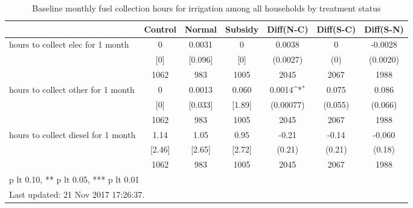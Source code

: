 \begin{table}[htbp]\centering
\def\sym#1{\ifmmode^{#1}\else\(^{#1}\)\fi}
\caption{Baseline monthly fuel collection hours for irrigation among all households by treatment status \label{tab:"balance"}}
\begin{tabular*}{1\hsize}{@{\hskip\tabcolsep\extracolsep\fill}l*{1}{cccccc}}
\toprule
                                &  Control&   Normal&  Subsidy&Diff(N-C)         &Diff(S-C)         &Diff(S-N)         \\
\midrule
hours to collect elec for 1 month&        0&   0.0031&        0&   0.0038         &        0         &  -0.0028         \\
                                &      [0]&  [0.096]&      [0]& (0.0027)         &      (0)         & (0.0020)         \\
                                &     1062&      983&     1005&     2045         &     2067         &     1988         \\
hours to collect other for 1 month&        0&   0.0013&    0.060&   0.0014\sym{*}  &    0.075         &    0.086         \\
                                &      [0]&  [0.033]&   [1.89]&(0.00077)         &  (0.055)         &  (0.066)         \\
                                &     1062&      983&     1005&     2045         &     2067         &     1988         \\
hours to collect diesel for 1 month&     1.14&     1.05&     0.95&    -0.21         &    -0.14         &   -0.060         \\
                                &   [2.46]&   [2.65]&   [2.72]&   (0.21)         &   (0.21)         &   (0.18)         \\
                                &     1062&      983&     1005&     2045         &     2067         &     1988         \\
\bottomrule
\multicolumn{7}{l}{\footnotesize * p lt 0.10, ** p lt 0.05, *** p lt 0.01}\\
\multicolumn{7}{l}{\footnotesize Last updated: 21 Nov 2017 17:26:37.}\\
\end{tabular*}
\end{table}
